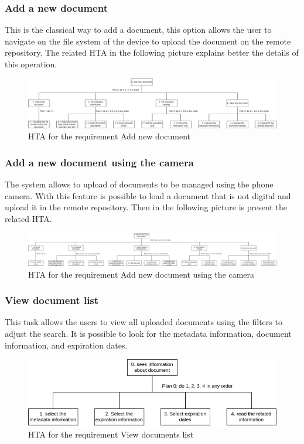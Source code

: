 \subsubsection{Add a new document}
This is the classical way to add a document, this option allows the user to navigate on the file system of the device to upload the document on the remote repository.
The related HTA in the following picture explains better the details of this operation.
\begin{figure}[H]
	\centering
	\includegraphics[width=\textwidth]{../Draw.io diagrams/add_new_document.drawio.png}  %
	\caption{HTA for the requirement Add new document}
\end{figure}
\subsubsection{Add a new document using the camera}
The system allows to upload of documents to be managed using the phone camera. With this feature is possible to load a document that is not digital and upload it in the remote repository. Then in the following picture is present the related HTA.
\begin{figure}[H]
	\centering
	\includegraphics[width=\textwidth]{../Draw.io diagrams/add_new_document_camera.drawio.png}  %
	\caption{HTA for the requirement Add new document using the camera}
\end{figure}
\subsubsection{View document list}
This task allows the users to view all uploaded documents using the filters to adjust the search. It is possible to look for the metadata information, document information, and expiration dates.
\begin{figure}[H]
	\centering
	\includegraphics[width=\textwidth]{../Draw.io diagrams/search_and_view_documents.drawio.png}  %
	\caption{HTA for the requirement View documents list}
\end{figure}

